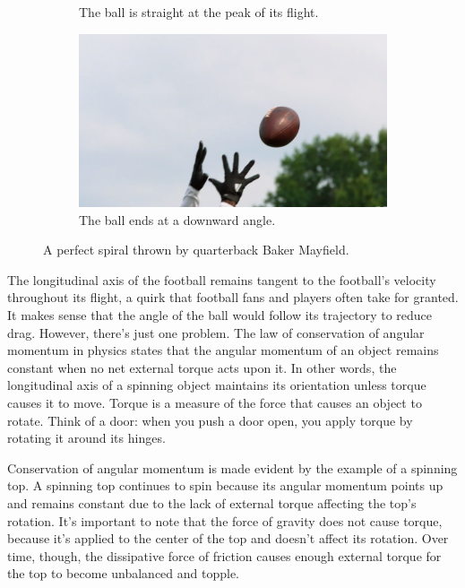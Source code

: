 \documentclass{article}
\begin{document}
\begin{figure}[h]
\begin{subfigure}[b]{0.3\textwidth}
         \caption{The ball is straight at the peak of its flight.}
     \end{subfigure}
     \hfill
     \begin{subfigure}[b]{0.3\textwidth}
         \includegraphics[width=\textwidth]{img/catch.png}
         \caption{The ball ends at a downward angle.}
     \end{subfigure}
    \caption{A perfect spiral thrown by quarterback Baker Mayfield.}
    \label{bakerspiral}
\end{figure}

The longitudinal axis of the football remains tangent to the football's velocity throughout its flight, a quirk that football fans and players often take for granted. It makes sense that the angle of the ball would follow its trajectory to reduce drag. However, there's just one problem. The law of conservation of angular momentum in physics states that the angular momentum of an object remains constant when no net external torque acts upon it. In other words, the longitudinal axis of a spinning object maintains its orientation unless torque causes it to move. Torque is a measure of the force that causes an object to rotate. Think of a door: when you push a door open, you apply torque by rotating it around its hinges. 

Conservation of angular momentum is made evident by the example of a spinning top. A spinning top continues to spin because its angular momentum points up and remains constant due to the lack of external torque affecting the top's rotation. It's important to note that the force of gravity does not cause torque, because it's applied to the center of the top and doesn't affect its rotation. Over time, though, the dissipative force of friction causes enough external torque for the top to become unbalanced and topple.
\end{document}
